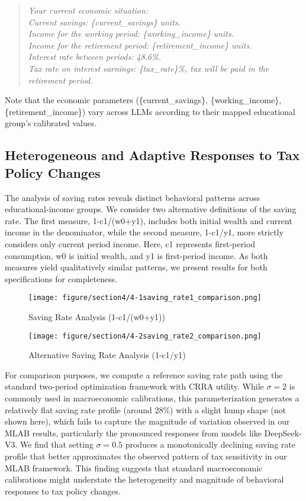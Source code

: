 \documentclass[12pt]{article}
\begin{document}
\begin{CJK*}{UTF8}{gbsn}
\begin{quote}
\itshape
Your current economic situation:\\
Current savings: \{current\_savings\} units.\\
Income for the working period: \{working\_income\} units.\\
Income for the retirement period: \{retirement\_income\} units.\\
Interest rate between periods: 48.6\%.\\
Tax rate on interest earnings: \{tax\_rate\}\%, tax will be paid in the retirement period.
\end{quote}

Note that the economic parameters (\{current\_savings\}, \{working\_income\}, \{retirement\_income\}) vary across LLMs according to their mapped educational group's calibrated values.

\subsection{Heterogeneous and Adaptive Responses to Tax Policy Changes}

The analysis of saving rates reveals distinct behavioral patterns across educational-income groups. We consider two alternative definitions of the saving rate. The first measure, 1-c1/(w0+y1), includes both initial wealth and current income in the denominator, while the second measure, 1-c1/y1, more strictly considers only current period income. Here, c1 represents first-period consumption, w0 is initial wealth, and y1 is first-period income. As both measures yield qualitatively similar patterns, we present results for both specifications for completeness.

\begin{figure}[h]
\centering
\texttt{[image: figure/section4/4-1saving\_rate1\_comparison.png]}
\caption{Saving Rate Analysis (1-c1/(w0+y1))}
\label{fig:saving_rate1}
\end{figure}

\begin{figure}[h]
\centering
\texttt{[image: figure/section4/4-2saving\_rate2\_comparison.png]}
\caption{Alternative Saving Rate Analysis (1-c1/y1)}
\label{fig:saving_rate2}
\end{figure}

For comparison purposes, we compute a reference saving rate path using the standard two-period optimization framework with CRRA utility. While $\sigma = 2$ is commonly used in macroeconomic calibrations, this parameterization generates a relatively flat saving rate profile (around 28\%) with a slight hump shape (not shown here), which fails to capture the magnitude of variation observed in our MLAB results, particularly the pronounced responses from models like DeepSeek-V3. We find that setting $\sigma = 0.5$ produces a monotonically declining saving rate profile that better approximates the observed pattern of tax sensitivity in our MLAB framework. This finding suggests that standard macroeconomic calibrations might understate the heterogeneity and magnitude of behavioral responses to tax policy changes.


\end{CJK*}
\end{document}
